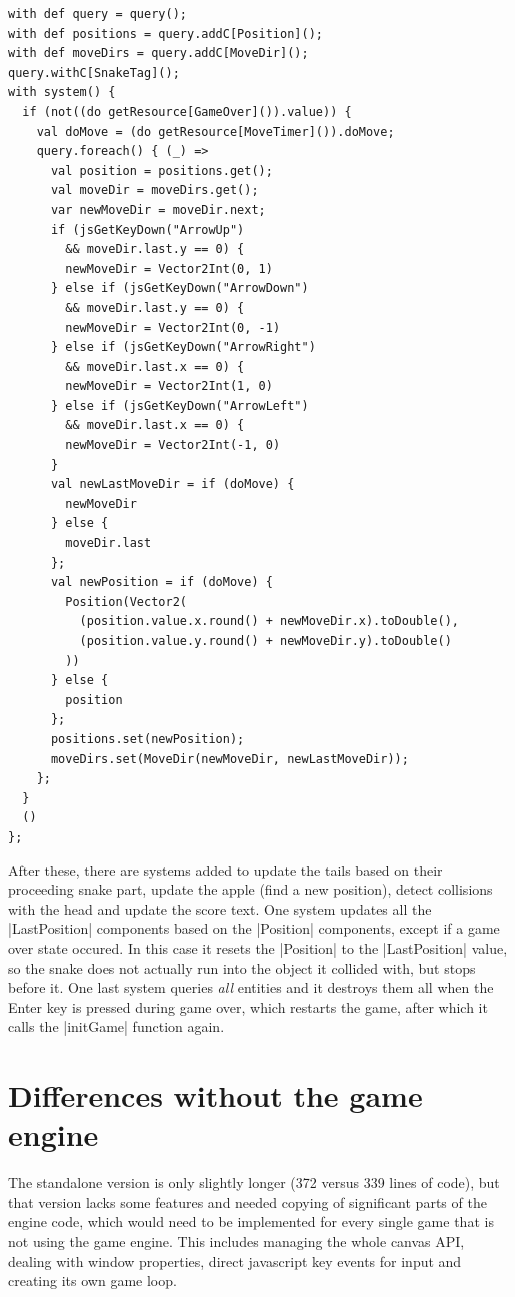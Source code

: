 \begin{lstlisting}
with def query = query();
with def positions = query.addC[Position]();
with def moveDirs = query.addC[MoveDir]();
query.withC[SnakeTag]();
with system() {
  if (not((do getResource[GameOver]()).value)) {
    val doMove = (do getResource[MoveTimer]()).doMove;
    query.foreach() { (_) =>
      val position = positions.get();
      val moveDir = moveDirs.get();
      var newMoveDir = moveDir.next;
      if (jsGetKeyDown("ArrowUp")
	  	&& moveDir.last.y == 0) {
        newMoveDir = Vector2Int(0, 1)
      } else if (jsGetKeyDown("ArrowDown")
	  	&& moveDir.last.y == 0) {
        newMoveDir = Vector2Int(0, -1)
      } else if (jsGetKeyDown("ArrowRight")
	  	&& moveDir.last.x == 0) {
        newMoveDir = Vector2Int(1, 0)
      } else if (jsGetKeyDown("ArrowLeft")
		&& moveDir.last.x == 0) {
        newMoveDir = Vector2Int(-1, 0)
      }
      val newLastMoveDir = if (doMove) {
        newMoveDir
      } else {
        moveDir.last
      };
      val newPosition = if (doMove) {
        Position(Vector2(
          (position.value.x.round() + newMoveDir.x).toDouble(),
          (position.value.y.round() + newMoveDir.y).toDouble()
        ))
      } else {
        position
      };
      positions.set(newPosition);
      moveDirs.set(MoveDir(newMoveDir, newLastMoveDir));
    };
  }
  ()
};
\end{lstlisting}

After these, there are systems added to update the tails based on their proceeding snake part, update the apple (find a new position), detect collisions with the head and update the score text. One system updates all the |LastPosition| components based on the |Position| components, except if a game over state occured. In this case it resets the |Position| to the |LastPosition| value, so the snake does not actually run into the object it collided with, but stops before it. One last system queries \textit{all} entities and it destroys them all when the Enter key is pressed during game over, which restarts the game, after which it calls the |initGame| function again.

\section{Differences without the game engine}

The standalone version is only slightly longer (372 versus 339 lines of code), but that version lacks some features and needed copying of significant parts of the engine code, which would need to be implemented for every single game that is not using the game engine. This includes managing the whole canvas API, dealing with window properties, direct javascript key events for input and creating its own game loop.

